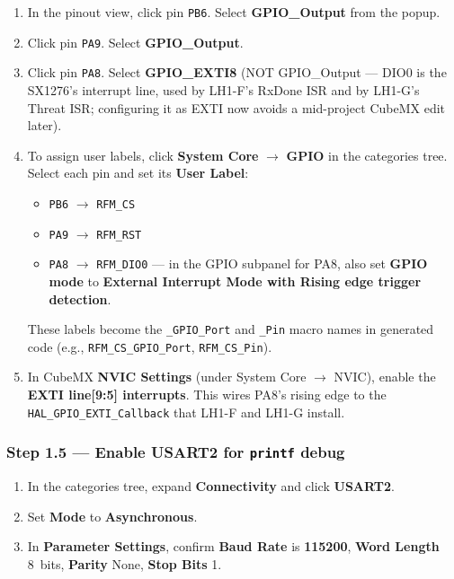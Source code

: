 \documentclass[11pt,letterpaper]{article}
\begin{document}
\begin{enumerate}[leftmargin=2em]
	\item In the pinout view, click pin \texttt{PB6}. Select \textbf{GPIO\_Output} from the popup.
	\item Click pin \texttt{PA9}. Select \textbf{GPIO\_Output}.
	\item Click pin \texttt{PA8}. Select \textbf{GPIO\_EXTI8} (NOT GPIO\_Output --- DIO0 is the SX1276's interrupt line, used by LH1-F's RxDone ISR and by LH1-G's Threat ISR; configuring it as EXTI now avoids a mid-project CubeMX edit later).
	\item To assign user labels, click \textbf{System Core} $\to$ \textbf{GPIO} in the categories tree. Select each pin and set its \textbf{User Label}:
	\begin{itemize}[leftmargin=1.2em, topsep=2pt, itemsep=2pt]
		\item \texttt{PB6} $\to$ \texttt{RFM\_CS}
		\item \texttt{PA9} $\to$ \texttt{RFM\_RST}
		\item \texttt{PA8} $\to$ \texttt{RFM\_DIO0} --- in the GPIO subpanel for PA8, also set \textbf{GPIO mode} to \textbf{External Interrupt Mode with Rising edge trigger detection}.
	\end{itemize}
	These labels become the \texttt{\_GPIO\_Port} and \texttt{\_Pin} macro names in generated code (e.g., \texttt{RFM\_CS\_GPIO\_Port}, \texttt{RFM\_CS\_Pin}).
	\item In CubeMX \textbf{NVIC Settings} (under System Core $\to$ NVIC), enable the \textbf{EXTI line[9:5] interrupts}. This wires PA8's rising edge to the \texttt{HAL\_GPIO\_EXTI\_Callback} that LH1-F and LH1-G install.
\end{enumerate}

\subsubsection*{Step 1.5 --- Enable USART2 for \texttt{printf} debug}

\begin{enumerate}[leftmargin=2em]
	\item In the categories tree, expand \textbf{Connectivity} and click \textbf{USART2}.
	\item Set \textbf{Mode} to \textbf{Asynchronous}.
	\item In \textbf{Parameter Settings}, confirm \textbf{Baud Rate} is \textbf{115200}, \textbf{Word Length} 8~bits, \textbf{Parity} None, \textbf{Stop Bits} 1.
\end{enumerate}
\end{document}

